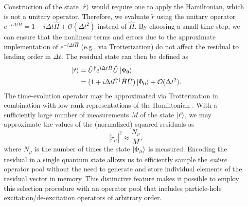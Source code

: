 \documentclass[aps,prx, reprint]{revtex4-2}
\providecommand{\norm}[1]{| #1 |^{2}}
\newcommand*{\Ud}{\hat{U}^{\dagger}}
\providecommand{\norm}[1]{\lVert#1\rVert}
\begin{document}
Construction of the state $\ket{\tilde{r}}$ would require one to apply the Hamiltonian, which is not a unitary operator.
Therefore, we evaluate $\tilde{r}$ using the unitary operator $e^{-i \Delta t \hat{H}} = 1 -i \Delta t \hat{H} + \mathcal{O}(\Delta t^2)$ instead of $\hat{H}$.
By choosing a small time step, we can ensure that the nonlinear terms and errors due to the approximate implementation of $e^{-i \Delta t \hat{H}}$ (e.g., via Trotterization) do not affect the residual to leading order in $\Delta t$.
The residual state can then be defined as
\begin{equation}
    \begin{split}
        \ket{\tilde{r}} &= \Ud e^{i \Delta t \hat{H}} \hat{U} \ket{\Phi_0} \\
        &=  (1 + i\Delta t \Ud \hat{H} \hat{U})  \ket{\Phi_0} + \mathcal{O}(\Delta t^2).
    \end{split}
\end{equation}
The time-evolution operator may be approximated via Trotterization \cite{trotter1959product, suzuki1993improved} in combination with low-rank representations of the Hamiltonian \cite{berry2019qubitization}.
With a sufficiently large number of measurements $M$ of the state $\ket{\tilde{r}}$, we may approximate the values of the (normalized) squared residuals as
\begin{equation}
\label{eq:approx_res_sq}
\norm{\tilde{r}_\mu} \approx \frac{N_\mu }{ M },
\end{equation}
where $N_\mu$ is the number of times the state $\ket{\Phi_\mu}$ is measured.
Encoding the residual in a single quantum state allows us to efficiently sample the \textit{entire} operator pool without the need to generate and store individual elements of the residual vector in memory.
This distinctive feature makes it possible to employ this selection procedure with an operator pool that includes particle-hole excitation/de-excitation operators of arbitrary order.
\end{document}
